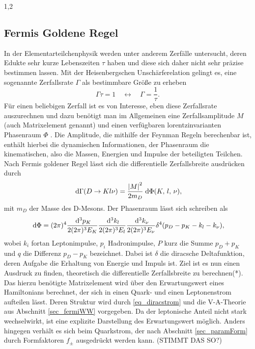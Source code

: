 \documentclass[11pt,a4paper,twoside]{report}
\begin{document}
\begin{spacing}{1,2}
\subsection{Fermis Goldene Regel}
\label{sec_fermigoldenrule}
In der Elementarteilchenphysik werden unter anderem Zerfälle untersucht, deren Edukte sehr kurze Lebenszeiten $\tau$ haben und diese sich daher nicht sehr präzise
bestimmen lassen. Mit der Heisenbergschen Unschärferelation gelingt es, eine sogenannte Zerfallsrate $\Gamma$ als bestimmbare Größe zu erheben
\begin{equation}
 \Gamma \tau = 1 \quad \leftrightarrow\quad  \Gamma = \frac{1}{\tau}.
\end{equation} 
Für einen beliebigen Zerfall ist es von Interesse, eben diese Zerfallsrate auszurechnen und dazu
benötigt man im Allgemeinen eine Zerfallsamplitude $M$ (auch Matrixelement genannt) und einen verfügbaren lorentzinvarianten Phasenraum $\Phi$ 
\cite{TeilFortgeschr}\cite{Griffiths}. Die Amplitude,
die mithilfe der Feynman Regeln berechenbar ist, enthält hierbei die dynamischen Informationen, der Phasenraum die kinematischen, also die Massen, Energien
und Impulse der beteiligten Teilchen. Nach Fermis goldener Regel lässt sich die differentielle Zerfallsbreite ausdrücken durch
\begin{equation}
 \; \mathrm{d} \Gamma(D \rightarrow K l \nu) = \frac{\left|M\right|^2}{2m_D}\; \mathrm{d} \Phi(K, \,l,\, \nu),
 \label{eq_fermirule}
\end{equation}
mit $m_D$ der Masse des D-Mesons. Der Phasenraum lässt sich schreiben als
\begin{equation}
 \; \mathrm{d} \Phi = (2\pi)^4 \frac{\; \mathrm{d}^3p_K}{2(2\pi)^3E_K}\frac{\; \mathrm{d}^3k_l}{2(2\pi)^3E_l}\frac{\; \mathrm{d}^3k_\nu}{2(2\pi)^3E_\nu}\delta^4(p_D-p_K-k_l-k_\nu),
\end{equation}
wobei $k_i$ fortan Leptonimpulse, $p_i$ Hadronimpulse, $P$ kurz die Summe $p_D+p_K$ und $q$ die Differenz $p_D - p_K$ bezeichnet. 
Dabei ist $\delta$ die diracsche Deltafunktion, deren Aufgabe die Erhaltung von Energie und Impuls ist. Ziel ist es nun einen Ausdruck zu finden,
theoretisch die differentielle Zerfallsbreite zu berechnen(*). Das hierzu benötigte Matrixelement wird über den Erwartungswert eines Hamiltonians berechnet,
der sich in einen Quark- und einen Leptonenstrom aufteilen lässt. Deren Struktur wird durch \eqref{eq_diracstrom} und die V-A-Theorie aus Abschnitt 
\ref{sec_fermiWW} vorgegeben. Da der leptonische Anteil nicht stark wechselwirkt, ist eine explizite Darstellung des Erwartungswert möglich. Anders hingegen
verhält es sich beim Quarkstrom, der nach Abschnitt \ref{sec_paramForm} durch Formfaktoren $f_\pm$ ausgedrückt werden kann. (STIMMT DAS SO?)

\end{spacing}
\end{document}
